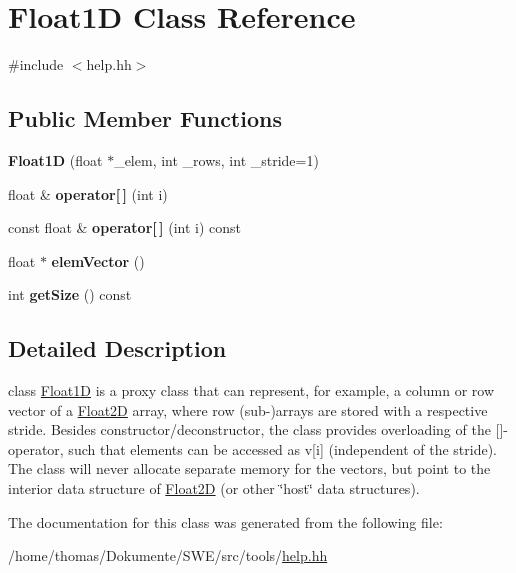 \hypertarget{classFloat1D}{\section{Float1\-D Class Reference}
\label{classFloat1D}
}


{\ttfamily \#include $<$help.\-hh$>$}

\subsection*{Public Member Functions}
\begin{DoxyCompactItemize}
\item 
\hypertarget{classFloat1D_abac72fb922ec7c6d05818be856ede9a2}{{\bfseries Float1\-D} (float $\ast$\-\_\-elem, int \-\_\-rows, int \-\_\-stride=1)}\label{classFloat1D_abac72fb922ec7c6d05818be856ede9a2}

\item 
\hypertarget{classFloat1D_a4602b1598eaf2e130a55df93b9723e91}{float \& {\bfseries operator\mbox{[}$\,$\mbox{]}} (int i)}\label{classFloat1D_a4602b1598eaf2e130a55df93b9723e91}

\item 
\hypertarget{classFloat1D_af3356b364d5ff56f3740729724da0467}{const float \& {\bfseries operator\mbox{[}$\,$\mbox{]}} (int i) const }\label{classFloat1D_af3356b364d5ff56f3740729724da0467}

\item 
\hypertarget{classFloat1D_a2e7889e514588f539a8dc47c75e70601}{float $\ast$ {\bfseries elem\-Vector} ()}\label{classFloat1D_a2e7889e514588f539a8dc47c75e70601}

\item 
\hypertarget{classFloat1D_a247a2e783f7300467c55fa2e7b19aa43}{int {\bfseries get\-Size} () const }\label{classFloat1D_a247a2e783f7300467c55fa2e7b19aa43}

\end{DoxyCompactItemize}


\subsection{Detailed Description}
class \hyperlink{classFloat1D}{Float1\-D} is a proxy class that can represent, for example, a column or row vector of a \hyperlink{classFloat2D}{Float2\-D} array, where row (sub-\/)arrays are stored with a respective stride. Besides constructor/deconstructor, the class provides overloading of the \mbox{[}\mbox{]}-\/operator, such that elements can be accessed as v\mbox{[}i\mbox{]} (independent of the stride). The class will never allocate separate memory for the vectors, but point to the interior data structure of \hyperlink{classFloat2D}{Float2\-D} (or other \char`\"{}host\char`\"{} data structures). 

The documentation for this class was generated from the following file\-:\begin{DoxyCompactItemize}
\item 
/home/thomas/\-Dokumente/\-S\-W\-E/src/tools/\hyperlink{help_8hh}{help.\-hh}\end{DoxyCompactItemize}
